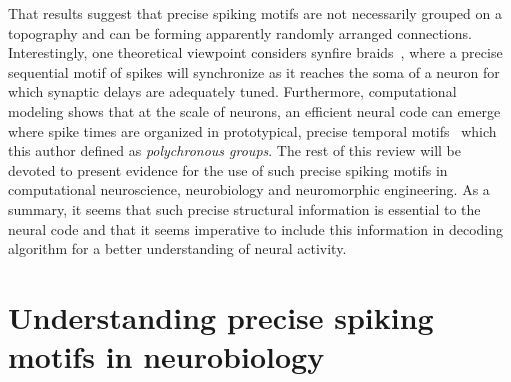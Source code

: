 \documentclass[brainsci, %
               review,submit,pdftex,moreauthors
               ]{Definitions/mdpi}
\begin{document}
That results suggest that precise spiking motifs are not necessarily grouped on a topography and can be forming apparently randomly arranged connections. Interestingly, one theoretical viewpoint considers synfire braids~\citep{bienenstock_model_1995}, where a precise sequential motif of spikes will synchronize as it reaches the soma of a neuron for which synaptic delays are adequately tuned. Furthermore, computational modeling shows that at the scale of neurons, an efficient neural code can emerge where spike times are organized in prototypical, precise temporal motifs~\citep{izhikevich_polychronization_2006} which this author defined as \emph{polychronous groups}. The rest of this review will be devoted to present evidence for the use of such precise spiking motifs in computational neuroscience, neurobiology and neuromorphic engineering. As a summary, it seems that such precise structural information is essential to the neural code and that it seems imperative to include this information in decoding algorithm for a better understanding of neural activity.
%
\section{Understanding precise spiking motifs in neurobiology}\label{sec:detection}
\end{document}
